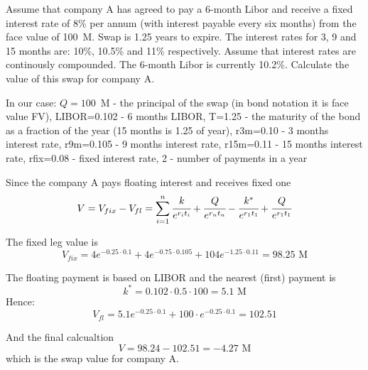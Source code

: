 \documentclass[12pt,a4paper]{book}
\begin{document}
\begin{exercise}[subtitle=Interest Rate Swap]
Assume that company A has agreed to pay a 6-month Libor and receive a fixed interest rate of 8\% per annum (with interest payable every six months) from the face value of 100~M. Swap is 1.25 years to expire. The interest rates for 3, 9 and 15 months are: 10\%, 10.5\% and 11\% respectively. Assume that interest rates are continously compounded. The 6-month Libor is currently 10.2\%. Calculate the value of this swap for company A.
\end{exercise}
\begin{solution}
In our case: $Q= 100$~M - the principal of the swap (in bond notation it is face value FV), LIBOR=0.102 - 6 months LIBOR, T=1.25 - the maturity of the bond as a fraction of the year (15 months is 1.25 of year), r3m=0.10 - 3 months interest rate, r9m=0.105 - 9 months interest rate, r15m=0.11 - 15 months interest rate, rfix=0.08 - fixed interest rate, 2 - number of payments in a year

Since the company A pays floating interest and receives fixed one
\begin{equation*}
V=V_{fix}-V_{fl} = \sum_{i=1}^n \cfrac{k}{e^{r_i t_i}} + \cfrac{Q}{e^{r_n t_n}} - \cfrac{k^*}{e^{r_1 t_1}}+\cfrac{Q}{e^{r_1 t_1}}
\end{equation*}

The fixed leg value is
\begin{equation*}
V_{fix} = 4e^{-0.25\cdot 0.1} +  4e^{-0.75\cdot 0.105} +  104e^{-1.25\cdot 0.11} = 98.25\text{~M}
\end{equation*}

The floating payment is based on LIBOR and the nearest (first) payment is 
\begin{equation*}
k^*=0.102\cdot0.5\cdot 100 = 5.1\text{~M}
\end{equation*}
Hence:
\begin{equation*}
V_{fl}=5.1e^{-0.25\cdot 0.1}+100\cdot e^{-0.25\cdot 0.1} = 102.51
\end{equation*}

And the final calcualtion
\begin{equation*}
V = 98.24-102.51=-4.27\text{~M}
\end{equation*}
which is the swap value for company A.
\end{solution}
\end{document}

